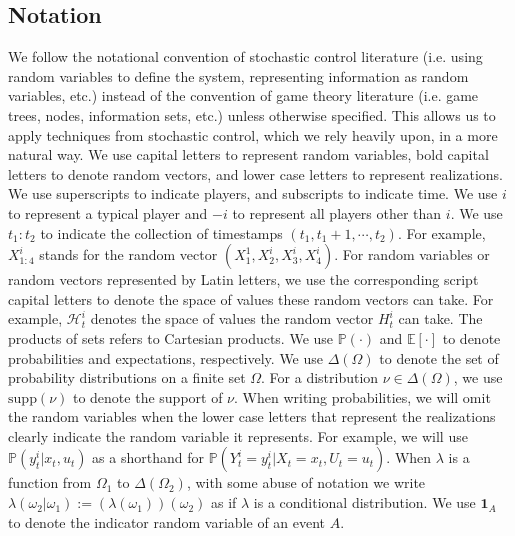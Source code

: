 \documentclass[pdflatex,sn-basic]{sn-jnl}
\newcommand{\E}{\mathbb{E}}
\renewcommand{\Pr}{\mathbb{P}}
\theoremstyle{thmstyleone}%
\theoremstyle{thmstyletwo}%
\theoremstyle{thmstylethree}%
\begin{document}
\subsection{Notation}\label{sec:notations}
We follow the notational convention of stochastic control literature (i.e. using random variables to define the system, representing information as random variables, etc.) instead of the convention of game theory literature (i.e. game trees, nodes, information sets, etc.) unless otherwise specified. This allows us to apply techniques from stochastic control, which we rely heavily upon, in a more natural way.
We use capital letters to represent random variables, bold capital letters to denote random vectors, and lower case letters to represent realizations. We use superscripts to indicate players, and subscripts to indicate time. We use $i$ to represent a typical player and $-i$ to represent all players other than $i$. We use $t_1:t_2$ to indicate the collection of timestamps $(t_1, t_1+1, \cdots, t_2)$. For example, $X_{1:4}^i$ stands for the random vector $(X_1^1, X_2^i, X_3^i, X_4^i)$. For random variables or random vectors represented by Latin letters, we use the corresponding script capital letters to denote the space of values these random vectors can take. For example, $\mathcal{H}_t^i$ denotes the space of values the random vector $H_t^i$ can take. The products of sets refers to Cartesian products. We use $\Pr(\cdot)$ and $\E[\cdot]$ to denote probabilities and expectations, respectively. We use $\Delta(\varOmega)$ to denote the set of probability distributions on a finite set $\varOmega$. For a distribution $\nu\in \Delta(\varOmega)$, we use $\mathrm{supp}(\nu)$ to denote the support of $\nu$. When writing probabilities, we will omit the random variables when the lower case letters that represent the realizations clearly indicate the random variable it represents. For example, we will use $\Pr(y_t^i|x_t, u_t)$ as a shorthand for $\Pr(Y_t^i = y_t^i|X_t = x_t, U_t=u_t)$. When $\lambda$ is a function from $\varOmega_1$ to $\Delta(\varOmega_2)$, with some abuse of notation we write $\lambda(\omega_2|\omega_1):=(\lambda(\omega_1))(\omega_2)$ as if $\lambda$ is a conditional distribution. We use $\bm{1}_A$ to denote the indicator random variable of an event $A$.
\end{document}
